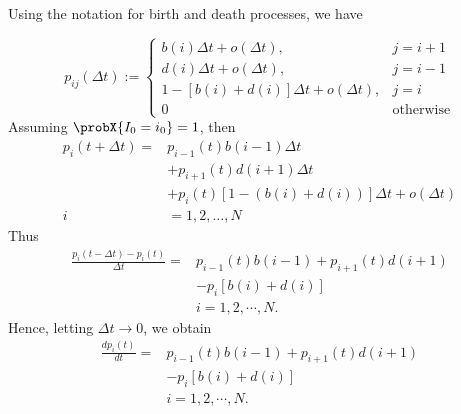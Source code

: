     \begin{frame}{}
        Using the notation for birth and death
        processes, we have

        \begin{equation*}
            p_{ij}(\Delta t):=
                \begin{cases}
                    b(i) \Delta t + o(\Delta t),     
                        & j = i + 1
                    \\
                    d(i) \Delta t + o(\Delta t), 
                        &   j = i - 1
                    \\
                    1 - \left [
                            b(i) + d(i) %
                        \right] \Delta t
                        + o(\Delta t), 
                        & j=i
                    \\
                    0 & \text{otherwise}
                \end{cases}
        \end{equation*}
        Assuming $\probX{I_0 = i_0} = 1$, then
        \begin{align*}
            p_i(t + \Delta t)
                =&
                    p_{i - 1} (t) b(i -1) \Delta t
                    \\
                    & + 
                        p_{i + 1} (t) d(i + 1) \Delta t
                    \\
                    & +
                        p_{i} (t)[1 - (b(i) + d(i))] \Delta t
                    + o(\Delta t)
            \\
            i &= 1, 2, \dots, N
        \end{align*}
        Thus
        \begin{align*}
            \frac{p_i (t - \Delta t) - p_i (t) }{\Delta t}
            = & 
            p_{i - 1} (t) b(i-1)
                +
                p_{i + 1} (t) d(i+1)  
            \\
                &-
                p_i [b(i) + d (i)] 
            \\
            & i = 1,2,\cdots, N.
        \end{align*}
        Hence, letting $\Delta t \to 0$,  we obtain
        \begin{align*}
            \frac{dp_i(t)}{dt}
            = & 
            p_{i - 1} (t) b(i-1)
                +
                p_{i + 1} (t) d(i+1)  
            \\
                &-
                p_i [b(i) + d (i)] 
            \\
                & i = 1,2,\cdots, N.
        \end{align*}
    \end{frame}
